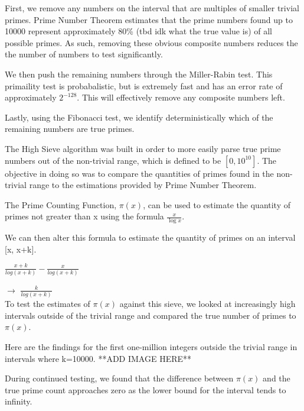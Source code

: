 \documentclass[11pt]{article}
\begin{document}
First, we remove any numbers on the interval that are multiples of smaller trivial primes. Prime Number Theorem estimates that the prime numbers found up to 10000 represent approximately 80\% (tbd idk what the true value is) of all possible primes. As such, removing these obvious composite numbers reduces the the number of numbers to test significantly.

We then push the remaining numbers through the Miller-Rabin test. This primaility test is probabalistic, but is extremely fast and has an error rate of approximately $2^{-128}$. This will effectively remove any composite numbers left.

Lastly, using the Fibonacci test, we identify deterministically which of the remaining numbers are true primes.

The High Sieve algorithm was built in order to more easily parse true prime numbers out of the non-trivial range, which is defined to be $[0, 10^{10}]$. The objective in doing so was to compare the quantities of primes found in the non-trivial range to the estimations provided by Prime Number Theorem.

The Prime Counting Function, $\pi(x)$, can be used to estimate the quantity of primes not greater than x using the formula $\frac{x}{\log{x}}$. 

We can then alter this formula to estimate the quantity of primes on an interval [x, x+k].

$\frac{x+k}{log(x+k)} - \frac{x}{log(x+k)}$

$\rightarrow$ $\frac{k}{log(x+k)}$\\

To test the estimates of $\pi(x)$ against this sieve, we looked at increasingly high intervals outside of the trivial range and compared the true number of primes to $\pi(x)$.

Here are the findings for the first one-million integers outside the trivial range in intervals where k=10000.
**ADD IMAGE HERE**

During continued testing, we found that the difference between $\pi(x)$ and the true prime count approaches zero as the lower bound for the interval tends to infinity.
\end{document}
